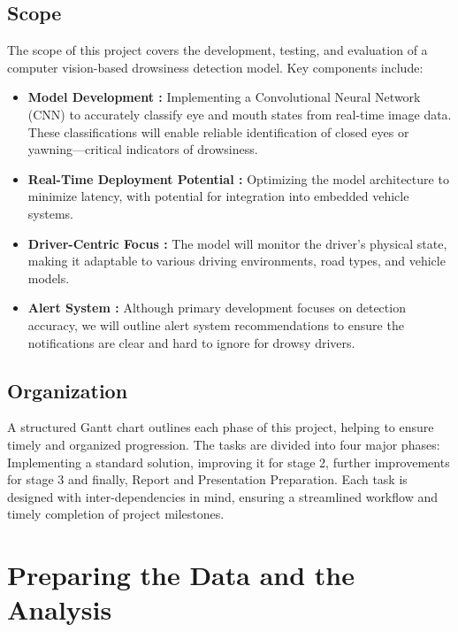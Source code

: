 \documentclass{modeleRapport}
\begin{document}
\subsection{Scope}

The scope of this project covers the development, testing, and evaluation of a computer vision-based drowsiness detection model. Key components include: 

\begin{itemize}

\item \textbf{Model Development :} Implementing a Convolutional Neural Network (CNN) to accurately classify eye and mouth states from real-time image data. These classifications will enable reliable identification of closed eyes or yawning—critical indicators of drowsiness. 

\item \textbf{Real-Time Deployment Potential :} Optimizing the model architecture to minimize latency, with potential for integration into embedded vehicle systems. 

\item \textbf{Driver-Centric Focus :} The model will monitor the driver’s physical state, making it adaptable to various driving environments, road types, and vehicle models. 

\item \textbf{Alert System :} Although primary development focuses on detection accuracy, we will outline alert system recommendations to ensure the notifications are clear and hard to ignore for drowsy drivers. 

\end{itemize}

\subsection{Organization}

A structured Gantt chart outlines each phase of this project, helping to ensure timely and organized progression. The tasks are divided into four major phases: Implementing a standard solution, improving it for stage 2, further improvements for stage 3 and finally, Report and Presentation Preparation. Each task is designed with inter-dependencies in mind, ensuring a streamlined workflow and timely completion of project milestones.

\newpage

\section{Preparing the Data and the Analysis}
\end{document}
